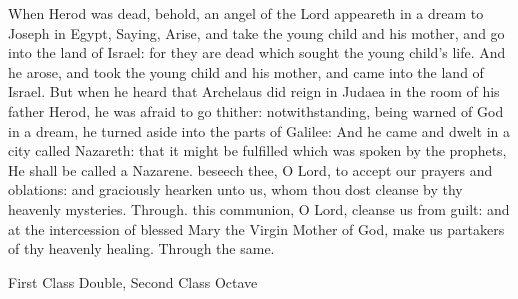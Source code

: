 
 When Herod was dead, behold, an angel of the Lord appeareth in a dream to Joseph in Egypt, Saying, Arise, and take the young child and his mother, and go into the land of Israel: for they are dead which sought the young child's life. And he arose, and took the young child and his mother, and came into the land of Israel. But when he heard that Archelaus did reign in Judaea in the room of his father Herod, he was afraid to go thither: notwithstanding, being warned of God in a dream, he turned aside into the parts of Galilee: And he came and dwelt in a city called Nazareth: that it might be fulfilled which was spoken by the prophets, He shall be called a Nazarene.
\secret
{} beseech thee, O Lord, to accept our prayers and oblations: and graciously hearken unto us, whom thou dost cleanse by thy heavenly mysteries. Through.
\postcommunion
{} this communion, O Lord, cleanse us from guilt: and at the intercession of blessed Mary the Virgin Mother of God, make us partakers of thy heavenly healing. Through the same.

\clearpage

\label{EpiphanyMass}
\begin{inhead}
{First Class Double, Second Class Octave}
\end{inhead}

\properantiphonfix


